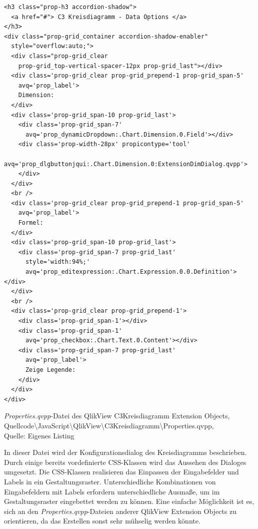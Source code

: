 \begin{listing}[htbp]
\begin{verbatim}
<h3 class="prop-h3 accordion-shadow">
  <a href="#"> C3 Kreisdiagramm - Data Options </a>
</h3>
<div class="prop-grid_container accordion-shadow-enabler"
  style="overflow:auto;">
  <div class="prop-grid_clear 
    prop-grid_top-vertical-spacer-12px prop-grid_last"></div>
  <div class='prop-grid_clear prop-grid_prepend-1 prop-grid_span-5'
    avq='prop_label'>
    Dimension:
  </div>
  <div class='prop-grid_span-10 prop-grid_last'>
    <div class='prop-grid_span-7' 
      avq='prop_dynamicDropdown:.Chart.Dimension.0.Field'></div>
    <div class='prop-width-28px' propicontype='tool'
      avq='prop_dlgbuttonjqui:.Chart.Dimension.0:ExtensionDimDialog.qvpp'>
    </div>
  </div>
  <br />
  <div class='prop-grid_clear prop-grid_prepend-1 prop-grid_span-5'
    avq='prop_label'>
    Formel:
  </div>
  <div class='prop-grid_span-10 prop-grid_last'>
    <div class='prop-grid_span-7 prop-grid_last'
      style='width:94%;' 
      avq='prop_editexpression:.Chart.Expression.0.0.Definition'></div>
  </div>
  <br />
  <div class='prop-grid_clear prop-grid_prepend-1'>
    <div class='prop-grid_span-1'></div>
    <div class='prop-grid_span-1' 
      avq='prop_checkbox:.Chart.Text.0.Content'></div>
    <div class='prop-grid_span-7 prop-grid_last'
      avq='prop_label'>
      Zeige Legende:
    </div>
  </div>
</div>
\end{verbatim}
\caption[\textit{Properties.qvpp}-Datei des QlikView C3Kreisdiagramm Extension Objects]{\textit{Properties.qvpp}-Datei des QlikView C3Kreisdiagramm Extension Objects, \\Quellcode\textbackslash{}JavaScript\textbackslash{}QlikView\textbackslash{}C3Kreisdiagramm\textbackslash{}Properties.qvpp, \\Quelle: Eigenes Listing}
\label{lst:JavascriptC3KreisdiagrammKonfigurationsdialogAusschnitt}
\end{listing}

In dieser Datei wird der Konfigurations\-dialog des Kreis\-diagramms beschrieben. Durch einige bereits vordefinierte CSS-Klassen wird das Aussehen des Dialoges umgesetzt. Die CSS-Klassen realisieren das Einpassen der Eingabefelder und Labels in ein Gestaltungsraster. Unterschiedliche Kombinationen von Eingabefeldern mit Labels erfordern unterschiedliche Ausmaße, um im Gestaltungsraster eingebettet werden zu können. Eine einfache Möglich\-keit ist es, sich an den \textit{Properties.qvpp}-Dateien anderer QlikView Extension Objects zu orientieren, da das Erstellen sonst sehr mühselig werden könnte.

